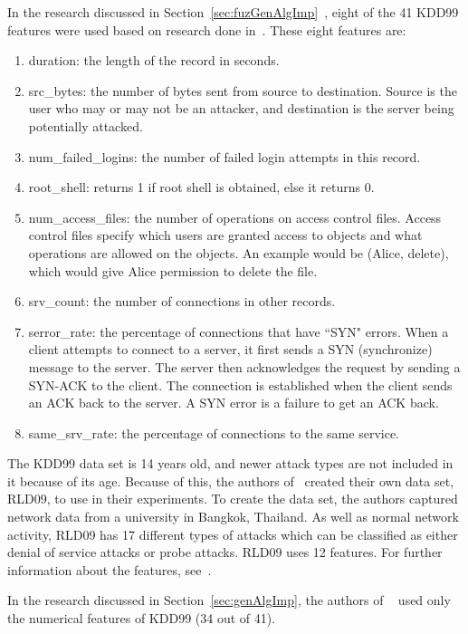 \documentclass{sig-alternate}
\begin{document}
In the research discussed in Section~\ref{sec:fuzGenAlgImp}~\cite{6496342, 6559603}, eight of the 41 KDD99 features were used based on research done in~\cite{Fries:2008:FAN:1388969.1389037}. These eight features are:
\begin{enumerate}
\setlength{\itemsep}{1pt}
  \item duration: the length of the record in seconds.
  \item src\_bytes: the number of bytes sent from source to destination. Source is the user who may or may not be an attacker, and destination is the server being potentially attacked.
  \item num\_failed\_logins: the number of failed login attempts in this record.
  \item root\_shell: returns 1 if root shell is obtained, else it returns 0.
  \item num\_access\_files: the number of operations on access control files. Access control files specify which users are granted access to objects and what operations are allowed on the objects. An example would be (Alice, delete), which would give Alice permission to delete the file.~\cite{accessControl}
  \item srv\_count: the number of connections in other records.
  \item serror\_rate: the percentage of connections that have ``SYN" errors. When a client attempts to connect to a server, it first sends a SYN (synchronize) message to the server. The server then acknowledges the request by sending a SYN-ACK to the client. The connection is established when the client sends an ACK back to the server. A SYN error is a failure to get an ACK back.~\cite{TCP}
  \item same\_srv\_rate: the percentage of connections to the same service.
\end{enumerate}

The KDD99 data set is 14 years old, and newer attack types are not included in it because of its age. Because of this, the authors of~\cite{6496342, 6559603} created their own data set, RLD09, to use in their experiments. To create the data set, the authors captured network data from a university in Bangkok, Thailand. As well as normal network activity, RLD09 has 17 different types of attacks which can be classified as either denial of service attacks or probe attacks. RLD09 uses 12 features. For further information about the features, see~\cite{6496342}.

In the research discussed in Section~\ref{sec:genAlgImp}, the authors of ~\cite{DBLP:journals/corr/abs-1204-1336} used only the numerical features of KDD99 (34 out of 41).
\end{document}
